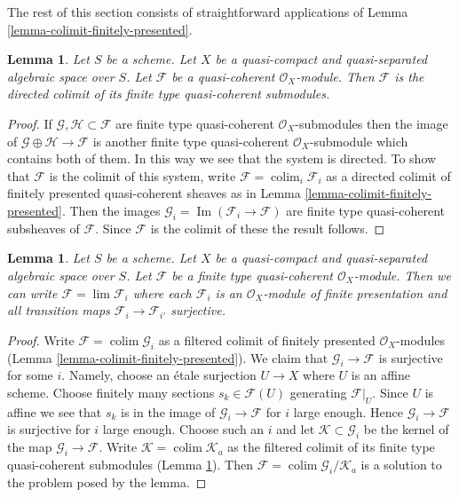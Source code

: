 \documentclass{stacks-project}
\theoremstyle{plain}
\newtheorem{lemma}[subsection]{Lemma}
\theoremstyle{definition}
\theoremstyle{remark}
\numberwithin{equation}{subsection}
\def\lim{\mathop{\mathrm{lim}}\nolimits}
\def\colim{\mathop{\mathrm{colim}}\nolimits}
\def\Im{\mathop{\mathrm{Im}}}
\begin{document}
\noindent
The rest of this section consists of straightforward
applications of Lemma \ref{lemma-colimit-finitely-presented}.

\begin{lemma}
\label{lemma-directed-colimit-finite-type}
Let $S$ be a scheme. Let $X$ be a quasi-compact and quasi-separated
algebraic space over $S$.
Let $\mathcal{F}$ be a quasi-coherent $\mathcal{O}_X$-module.
Then $\mathcal{F}$ is the directed colimit of its finite type
quasi-coherent submodules.
\end{lemma}

\begin{proof}
If $\mathcal{G}, \mathcal{H} \subset \mathcal{F}$ are finite type
quasi-coherent $\mathcal{O}_X$-submodules then the image
of $\mathcal{G} \oplus \mathcal{H} \to \mathcal{F}$ is another
finite type quasi-coherent $\mathcal{O}_X$-submodule which contains
both of them. In this way we see that the system is directed.
To show that $\mathcal{F}$ is the colimit of this system, write
$\mathcal{F} = \colim_i \mathcal{F}_i$ as a directed
colimit of finitely presented quasi-coherent sheaves as in
Lemma \ref{lemma-colimit-finitely-presented}.
Then the images $\mathcal{G}_i = \Im(\mathcal{F}_i \to \mathcal{F})$ are
finite type quasi-coherent subsheaves of $\mathcal{F}$. Since
$\mathcal{F}$ is the colimit of these the result follows.
\end{proof}

\begin{lemma}
\label{lemma-finite-directed-colimit-surjective-maps}
Let $S$ be a scheme. Let $X$ be a quasi-compact and quasi-separated
algebraic space over $S$. Let $\mathcal{F}$ be a finite type
quasi-coherent $\mathcal{O}_X$-module. Then we can write
$\mathcal{F} = \lim \mathcal{F}_i$ where each $\mathcal{F}_i$ is an
$\mathcal{O}_X$-module of finite presentation and all transition maps
$\mathcal{F}_i \to \mathcal{F}_{i'}$ surjective.
\end{lemma}

\begin{proof}
Write $\mathcal{F} = \colim \mathcal{G}_i$ as a filtered colimit of
finitely presented $\mathcal{O}_X$-modules
(Lemma \ref{lemma-colimit-finitely-presented}).
We claim that $\mathcal{G}_i \to \mathcal{F}$ is surjective for some $i$.
Namely, choose an \'etale surjection $U \to X$ where $U$ is an affine scheme.
Choose finitely many sections $s_k \in \mathcal{F}(U)$ generating
$\mathcal{F}|_U$. Since $U$ is affine we see that $s_k$ is in the image
of $\mathcal{G}_i \to \mathcal{F}$ for $i$ large enough. Hence
$\mathcal{G}_i \to \mathcal{F}$ is surjective for $i$ large enough.
Choose such an $i$ and let $\mathcal{K} \subset \mathcal{G}_i$ be the
kernel of the map $\mathcal{G}_i \to \mathcal{F}$. Write
$\mathcal{K} = \colim \mathcal{K}_a$
as the filtered colimit of its finite type quasi-coherent submodules
(Lemma \ref{lemma-directed-colimit-finite-type}). Then
$\mathcal{F} = \colim \mathcal{G}_i/\mathcal{K}_a$ is a solution
to the problem posed by the lemma.
\end{proof}
\end{document}
